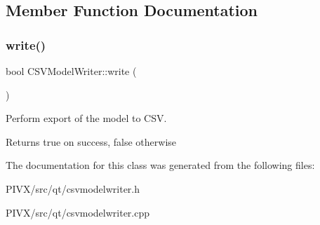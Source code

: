 \subsection{Member Function Documentation}
\mbox{\label{class_c_s_v_model_writer_a71fe52fdd6f41c506f9631175cb04615}} 
\subsubsection{\texorpdfstring{write()}{write()}}
{\footnotesize\ttfamily bool C\+S\+V\+Model\+Writer\+::write (\begin{DoxyParamCaption}{ }\end{DoxyParamCaption})}

Perform export of the model to C\+SV. \begin{DoxyReturn}{Returns}
true on success, false otherwise 
\end{DoxyReturn}


The documentation for this class was generated from the following files\+:\begin{DoxyCompactItemize}
\item 
P\+I\+V\+X/src/qt/csvmodelwriter.\+h\item 
P\+I\+V\+X/src/qt/csvmodelwriter.\+cpp\end{DoxyCompactItemize}
